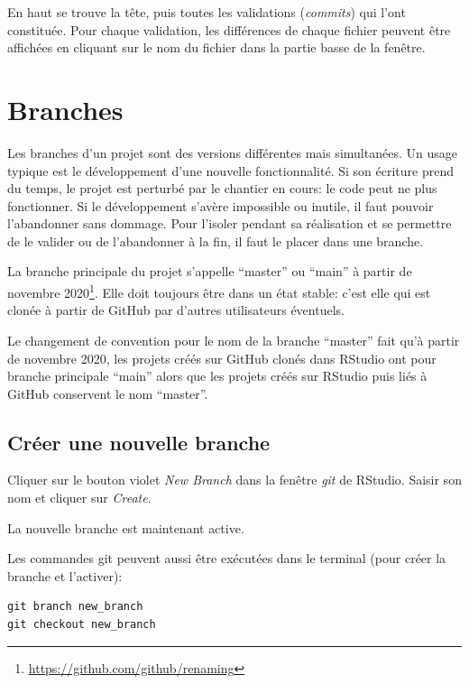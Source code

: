 \documentclass[
  12pt,
  french,
  a4paper,
  extrafontsizes,onecolumn,openright
  ]{memoir}
\begin{document}
En haut se trouve la tête, puis toutes les validations (\emph{commits}) qui l'ont constituée.
Pour chaque validation, les différences de chaque fichier peuvent être affichées en cliquant sur le nom du fichier dans la partie basse de la fenêtre.

\hypertarget{sec:branches}{%
\section{Branches}\label{sec:branches}}

Les branches d'un projet sont des versions différentes mais simultanées.
Un usage typique est le développement d'une nouvelle fonctionnalité.
Si son écriture prend du temps, le projet est perturbé par le chantier en cours: le code peut ne plus fonctionner.
Si le développement s'avère impossible ou inutile, il faut pouvoir l'abandonner sans dommage.
Pour l'isoler pendant sa réalisation et se permettre de le valider ou de l'abandonner à la fin, il faut le placer dans une branche.

La branche principale du projet s'appelle \enquote{master} ou \enquote{main} à partir de novembre 2020\footnote{\url{https://github.com/github/renaming}}.
Elle doit toujours être dans un état stable: c'est elle qui est clonée à partir de GitHub par d'autres utilisateurs éventuels.

Le changement de convention pour le nom de la branche \enquote{master} fait qu'à partir de novembre 2020, les projets créés sur GitHub clonés dans RStudio ont pour branche principale \enquote{main} alors que les projets créés sur RStudio puis liés à GitHub conservent le nom \enquote{master}.

\hypertarget{cruxe9er-une-nouvelle-branche}{%
\subsection{Créer une nouvelle branche}\label{cruxe9er-une-nouvelle-branche}}

Cliquer sur le bouton violet \emph{New Branch} dans la fenêtre \emph{git} de RStudio.
Saisir son nom et cliquer sur \emph{Create}.

La nouvelle branche est maintenant active.

Les commandes git peuvent aussi être exécutées dans le terminal (pour créer la branche et l'activer):

\begin{verbatim}
git branch new_branch
git checkout new_branch
\end{verbatim}
\end{document}

